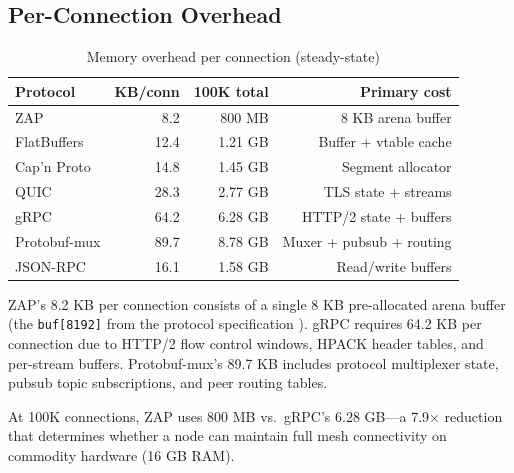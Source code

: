 \subsection{Per-Connection Overhead}

\begin{table}[h]
\centering
\caption{Memory overhead per connection (steady-state)}
\label{tab:connmem}
\begin{tabular}{lrrr}
\toprule
\textbf{Protocol} & \textbf{KB/conn} & \textbf{100K total} & \textbf{Primary cost} \\
\midrule
\rowcolor{luxblue!10}
ZAP & 8.2 & 800 MB & 8 KB arena buffer \\
FlatBuffers & 12.4 & 1.21 GB & Buffer + vtable cache \\
Cap'n Proto & 14.8 & 1.45 GB & Segment allocator \\
QUIC & 28.3 & 2.77 GB & TLS state + streams \\
gRPC & 64.2 & 6.28 GB & HTTP/2 state + buffers \\
Protobuf-mux & 89.7 & 8.78 GB & Muxer + pubsub + routing \\
JSON-RPC & 16.1 & 1.58 GB & Read/write buffers \\
\bottomrule
\end{tabular}
\end{table}

ZAP's 8.2 KB per connection consists of a single 8 KB pre-allocated arena buffer (the \texttt{buf[8192]} from the protocol specification \cite{zapwire}). gRPC requires 64.2 KB per connection due to HTTP/2 flow control windows, HPACK header tables, and per-stream buffers. Protobuf-mux's 89.7 KB includes protocol multiplexer state, pubsub topic subscriptions, and peer routing tables.

At 100K connections, ZAP uses 800 MB vs.\ gRPC's 6.28 GB---a 7.9$\times$ reduction that determines whether a node can maintain full mesh connectivity on commodity hardware (16 GB RAM).

